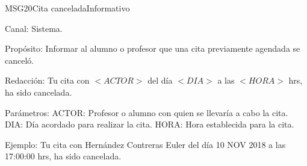 \begin{mensaje}{MSG20}{Cita cancelada}{Informativo}
	\item[Canal:] Sistema.
    \item[Propósito:] Informar al alumno o profesor que una cita previamente agendada se canceló. 
    \item[Redacción:] Tu cita con $<ACTOR>$ del día $<DIA>$ a las $<HORA>$ hrs, ha sido cancelada. 
    \item[Parámetros:] ACTOR: Profesor o alumno con quien se llevaría a cabo la cita. DIA: Día acordado para realizar la cita. HORA: Hora establecida para la cita.
    \item[Ejemplo:] Tu cita con Hernández Contreras Euler del día 10 NOV 2018 a las 17:00:00 hrs, ha sido cancelada. 
\end{mensaje}
